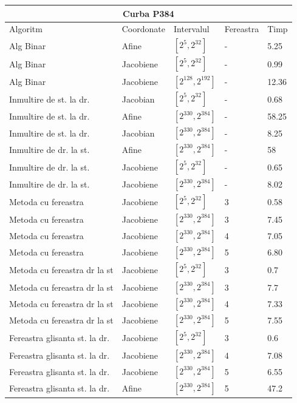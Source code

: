 \begin{tabular}{ |p{5cm}||p{3cm}|p{3cm}|p{2cm}|p{1cm}|  }
 \hline
 \multicolumn{5}{|c|}{Curba P384} \\
 \hline
 Algoritm& Coordonate &Intervalul &Fereastra &Timp\\
 \hline
 Alg Binar & Afine  &$[2^{5},2^{32}]$& - & 5.25\\
 Alg Binar&Jacobiene  & $[2^{5},2^{32}]$ & - & 0.99\\
  Alg Binar&Jacobiene  & $[2^{128},2^{192}]$ & - & 12.36\\
 Inmultire de st. la dr. & Jacobian & $[2^{5},2^{32}]$& - & 0.68\\
 Inmultire de st. la dr. & Afine & $[2^{330},2^{384}]$& - & 58.25\\
 Inmultire de st. la dr. & Jacobian & $[2^{330},2^{384}]$& - & 8.25\\
 Inmultire de dr. la st. &Afine & $[2^{330},2^{384}]$ & - & 58\\
 Inmultire de dr. la st. &Jacobiene & $[2^{5},2^{32}]$ & - & 0.65\\
 Inmultire de dr. la st. &Jacobiene & $[2^{330},2^{384}]$ & - & 8.02\\
 Metoda cu fereastra& Jacobiene & $[2^{5},2^{32}]$ & 3 & 0.58\\
 Metoda cu fereastra& Jacobiene & $[2^{330},2^{384}]$ & 3 & 7.45\\
 Metoda cu fereastra& Jacobiene &$[2^{330},2^{384}]$ & 4 & 7.05\\
 Metoda cu fereastra& Jacobiene & $[2^{330},2^{384}]$ & 5 & 6.80\\
 Metoda cu fereastra dr la st& Jacobiene & $[2^{5},2^{32}]$ & 3 & 0.7\\
 Metoda cu fereastra dr la st& Jacobiene & $[2^{330},2^{384}]$ & 3 & 7.7\\
 Metoda cu fereastra dr la st& Jacobiene & $[2^{330},2^{384}]$ & 4 & 7.33\\
 Metoda cu fereastra dr la st& Jacobiene & $[2^{330},2^{384}]$ & 5 & 7.55\\
 Fereastra glisanta st. la dr.& Jacobiene  & $[2^{5},2^{32}]$& 3 & 0.6\\
 Fereastra glisanta st. la dr.& Jacobiene  &$[2^{330},2^{384}]$& 4 & 7.08 \\
 Fereastra glisanta st. la dr.& Jacobiene  & $[2^{330},2^{384}]$& 5 & 6.55\\
 Fereastra glisanta st. la dr.& Afine  & $[2^{330},2^{384}]$& 5 & 47.2\\
 \hline
\end{tabular}	

